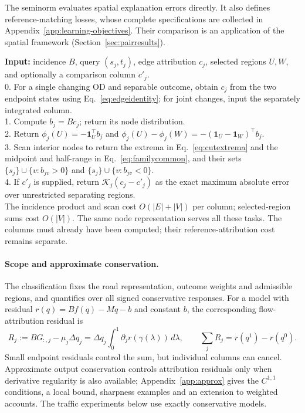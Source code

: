 \documentclass[a4paper,fleqn]{cas-sc}
\begin{document}
The seminorm evaluates spatial explanation errors directly. It also defines
reference-matching losses, whose complete specifications are collected in
Appendix~\ref{app:learning-objectives}. Their comparison is an application
of the spatial framework (Section~\ref{sec:pairresults}).

\begin{algo}[t]
\caption{Spatial accounts from an attribution column}\label{alg:spatial}
\small
\textbf{Input:} incidence $B$, query $(s_j,t_j)$, edge attribution $c_j$,
selected regions $U,W$, and optionally a comparison column $c'_j$.\\
0. For a single changing OD and separable outcome, obtain $c_j$ from the two endpoint states using Eq.~\eqref{eq:edgeidentity}; for joint changes, input the separately integrated column.\\
1. Compute $b_j=Bc_j$; return its node distribution.\\
2. Return $\phi_j(U)=-\mathbf1_U^\top b_j$ and
$\phi_j(U)-\phi_j(W)=-(\mathbf1_U-\mathbf1_W)^\top b_j$.\\
3. Scan interior nodes to return the extrema in Eq.~\eqref{eq:cutextrema}
and the midpoint and half-range in Eq.~\eqref{eq:familycommon},
and their sets $\{s_j\}\cup\{v:b_{jv}>0\}$ and
$\{s_j\}\cup\{v:b_{jv}<0\}$.\\
4. If $c'_j$ is supplied, return $\mathcal K_j(c_j-c'_j)$ as the exact
maximum absolute error over unrestricted separating regions.\\
The incidence product and scan cost $O(|E|+|V|)$ per column; selected-region
sums cost $O(|V|)$. The same node representation serves all these tasks. The columns must already
have been computed; their reference-attribution cost remains separate.
\end{algo}



\paragraph{Scope and approximate conservation.}\label{sec:noninheritance}
The classification fixes the road representation, outcome weights and
admissible regions, and quantifies over all signed conservative responses.
For a model with residual $r(q)=Bf(q)-Mq-b$ and constant $b$, the corresponding
flow-attribution residual is
\begin{equation}
R_j:=BG_{:,j}-\mu_j\Delta q_j
=\Delta q_j\int_0^1\partial_jr(\gamma(\lambda))\,d\lambda,
\qquad \sum_jR_j=r(q^1)-r(q^0).
\label{eq:residualidentity}
\end{equation}
Small endpoint residuals control the sum, but individual columns can cancel.
Approximate output conservation controls attribution residuals only when
derivative regularity is also available; Appendix~\ref{app:approx} gives
the $C^{1,1}$ conditions, a local bound, sharpness examples and an
extension to weighted accounts. The traffic experiments below use exactly
conservative models.
\end{document}
